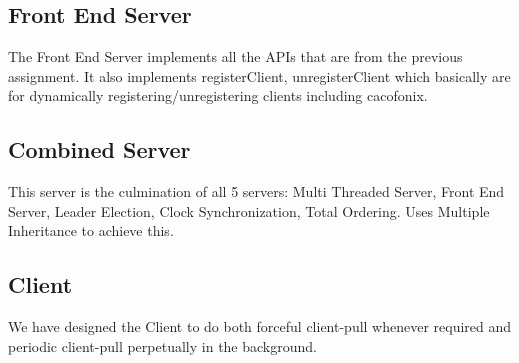 \documentclass{article}
\begin{document}
\subsection{Front End Server}
The Front End Server implements all the APIs that are from the previous assignment. It also implements registerClient, unregisterClient which basically are for dynamically registering/unregistering clients including cacofonix. 

\subsection{Combined Server}
This server is the culmination of all 5 servers: Multi Threaded Server, 
Front End Server, Leader Election, Clock Synchronization, Total Ordering.
Uses Multiple Inheritance to achieve this.

\subsection{Client}
We have designed the Client to do both forceful client-pull whenever required and periodic client-pull perpetually in the background.
\end{document}
